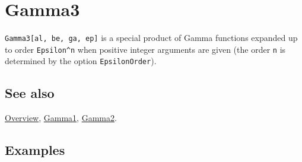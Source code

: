 \documentclass[../FeynCalcManual.tex]{subfiles}
\begin{document}
\hypertarget{gamma3}{%
\section{Gamma3}\label{gamma3}}

\texttt{Gamma3[\allowbreak{}al,\ \allowbreak{}be,\ \allowbreak{}ga,\ \allowbreak{}ep]}
is a special product of Gamma functions expanded up to order
\texttt{Epsilon^n} when positive integer arguments are given (the order
\texttt{n} is determined by the option \texttt{EpsilonOrder}).

\subsection{See also}

\hyperlink{toc}{Overview}, \hyperlink{gamma1}{Gamma1},
\hyperlink{gamma2}{Gamma2}.

\subsection{Examples}
\end{document}
